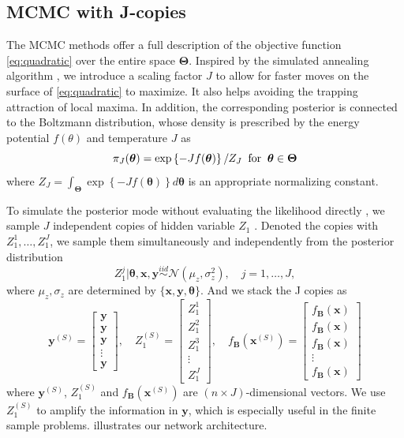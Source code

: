 \documentclass[ba]{imsart}
\newcommand{\bm}[1]{\boldsymbol{#1}}
\newcommand{\iid}{\stackrel{iid}{\sim}}
\def\B{\bm{B}}
\def\x{\bm{x}}
\def\y{\bm{y}}
\def\btheta{\bm{\theta}}
\def\bTheta{\bm{\Theta}}
\def\mN{\mathcal{N}}
\newcommand{\bx}{{\bm x}}
\newcommand{\by}{{\bm y}}
\numberwithin{equation}{section}
\theoremstyle{plain}
\begin{document}
\subsection{MCMC with J-copies}
The MCMC methods offer a full description of the objective function \eqref{eq:quadratic} over the entire space $\bTheta$. Inspired by the simulated annealing algorithm \citep{metropolis1953equation}, we introduce a scaling factor $J$ to allow for faster moves on the surface of \eqref{eq:quadratic} to maximize. It also helps avoiding the trapping attraction of local maxima. In addition, the corresponding posterior is connected to the Boltzmann distribution, whose  density is prescribed by the energy potential $f(\theta)$ and temperature $J$ as
\begin{equation}\label{eq:boltzmann}
\pi_J (\btheta) = \exp \left \{ -J f(\btheta) \right \} / Z_J \; \; {\rm for} \; \; \btheta \in \bTheta
\end{equation}
where $ Z_J = \int_{\bTheta} \exp \left \{ - J f(\btheta) \right \} d \btheta $ is an appropriate normalizing constant.

To simulate the posterior mode without evaluating the likelihood directly  \citep{jacquier2007mcmc}, we sample $J$ independent copies of hidden variable $Z_1$ .  Denoted the copies with $Z_1^1, \ldots, Z_1^J$,  we sample them simultaneously and independently from the posterior distribution 
\[Z_1^j|\btheta, \bx, \by \iid \mN(\mu_z, \sigma_z^2), \quad j=1, \ldots, J,\]
where $\mu_z, \sigma_z$ are determined by $\{\x, \y, \btheta\}$. And we stack the J copies as
\begin{equation}\label{eq:stacked}
\by^{(S)}=\left[\begin{array}{c}
\by\\
\by\\
\by\\
\vdots\\
\by
\end{array}\right], \quad Z_1^{(S)}=\left[\begin{array}{c}
Z_1^1\\
Z_1^2\\
Z_1^3\\
\vdots\\
Z_1^J
\end{array}\right],\quad {f_{\B}}(\bx^{(S)})=\left[\begin{array}{c}
f_{\B}(\bx)\\
f_{\B}(\bx)\\
f_{\B}(\bx)\\
\vdots\\
f_{\B}(\bx)
\end{array}\right]
\end{equation}
where $\by^{(S)}$, $Z_1^{(S)}$ and ${f_{\B}}(\bx^{(S)})$ are $(n\times J)$-dimensional vectors. We use $Z_1^{(S)}$ to amplify the information in $\by$, which is especially useful in the finite sample problems.  illustrates our network architecture.
\end{document}
